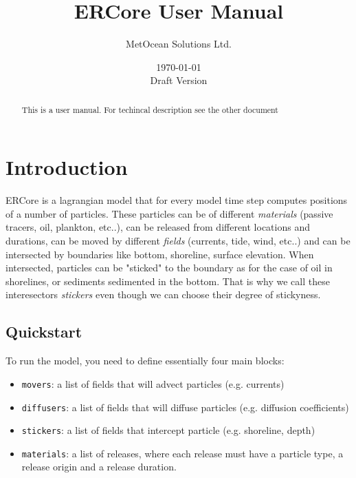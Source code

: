 \documentclass[a4paper]{article}
\title{ERCore User Manual}
\author{MetOcean Solutions Ltd.}
\date{\today\\Draft Version}
\begin{document}
\maketitle

\begin{abstract}
This is a user manual. For techincal description see the other document
\end{abstract}

\tableofcontents


\section{Introduction}
\label{sec:intro}


ERCore is a lagrangian model that for every model time step computes positions of a number of particles. These particles can be of different \textit{materials} (passive tracers, oil, plankton, etc..), can be released from different locations and durations, can be moved by different \textit{fields} (currents, tide, wind, etc..) and can be intersected by boundaries like bottom, shoreline, surface elevation. When intersected, particles can be "sticked" to the boundary as for the case of oil in shorelines, or sediments sedimented in the bottom. That is why we call these interesectors \textit{stickers} even though we can choose their degree of stickyness. 

\subsection{Quickstart}
\label{ssec:quickstart}
To run the model, you need to define essentially four main blocks:

\begin{itemize}
\item \texttt{movers}: a list of fields that will advect particles (e.g. currents)
\item \texttt{diffusers}: a list of fields that will diffuse particles (e.g. diffusion coefficients)
\item \texttt{stickers}: a list of fields that intercept particle (e.g. shoreline, depth)
\item \texttt{materials}: a list of releases, where each release must have a particle type, a release origin and a release duration.
\end{itemize}
\end{document}
